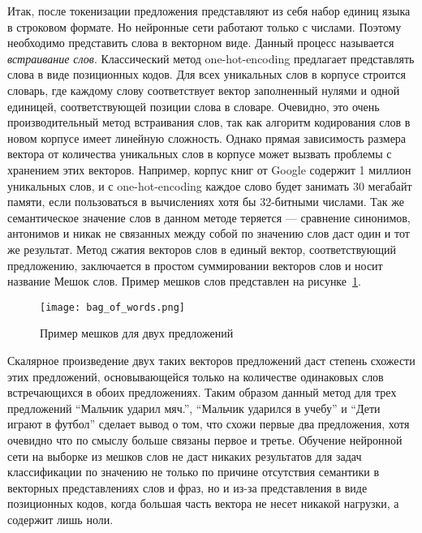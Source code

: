 Итак, после токенизации предложения представляют из себя набор единиц языка в строковом формате. Но нейронные сети работают только с числами. Поэтому необходимо представить слова в векторном виде. Данный процесс называется \textit{встраивание слов}. Классический метод one-hot-encoding предлагает представлять слова в виде позиционных кодов. Для всех уникальных слов в корпусе строится словарь, где каждому слову соответствует вектор заполненный нулями и одной единицей, соответствующей позиции слова в словаре. Очевидно, это очень производительный метод встраивания слов, так как алгоритм кодирования слов в новом корпусе имеет линейную сложность. Однако прямая зависимость размера вектора от количества уникальных слов в корпусе может вызвать проблемы с хранением этих векторов. Например, корпус книг от Google содержит 1 миллион уникальных слов, и с one-hot-encoding каждое слово будет занимать 30 мегабайт памяти, если пользоваться в вычислениях хотя бы 32-битными числами. Так же семантическое значение слов в данном методе теряется --- сравнение синонимов, антонимов и никак не связанных между собой по значению слов даст один и тот же результат. Метод сжатия векторов слов в единый вектор, соответствующий предложению, заключается в простом суммировании векторов слов и носит название Мешок слов. Пример мешков слов представлен на рисунке~\ref{fig:overview:bag_of_words}\cite{Goodfellow-et-al-2016}.

\begin{figure}
  \begin{center}
    \texttt{[image: bag\_of\_words.png]}
    \caption{Пример мешков для двух предложений}\label{fig:overview:bag_of_words}
  \end{center}
\end{figure}

Скалярное произведение двух таких векторов предложений даст степень схожести этих предложений, основывающейся только на количестве одинаковых слов встречающихся в обоих предложениях. Таким образом данный метод для трех предложений ``Мальчик ударил мяч.'', ``Мальчик ударился в учебу'' и ``Дети играют в футбол'' сделает вывод о том, что схожи первые два предложения, хотя очевидно что по смыслу больше связаны первое и третье. Обучение нейронной сети на выборке из мешков слов не даст никаких результатов для задач классификации по значению не только по причине отсутствия семантики в векторных представлениях слов и фраз, но и из-за представления в виде позиционных кодов, когда большая часть вектора не несет никакой нагрузки, а содержит лишь ноли\cite{Goodfellow-et-al-2016}.
